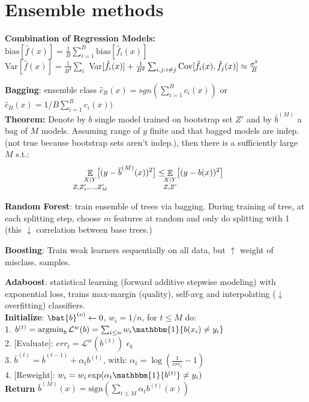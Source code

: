 \section{Ensemble methods}


\textbf{Combination of Regression Models:}\\
$\text{bias}[\hat{f}(x)] = \frac{1}{B} \sum_{i=1}^{B} \text{bias}[\hat{f}_i(x)]$\\
Var$[\hat{f}(x)] = \frac{1}{B^2}\sum_i$ Var$[\hat{f}_i(x)]
+ \frac{1}{B^2}\sum_{i,j:i\neq j} \operatorname{\textrm{Cov}}[\hat{f}_i(x), \hat{f}_j(x)] \approx \frac{\sigma^2}{B}$

\textbf{Bagging}:
ensemble class $\hat{c}_B(x)=sgn(\sum_{i=1}^{B} c_i(x))$ or $\hat{c}_B(x)=1/B\sum_{i=1}^{B} c_i(x))$\\

\textbf{Theorem:} Denote by $b$ single model trained on bootstrap set $Z'$ and by $\bar{b}^{(M)}$ a bag of $M$ models. Assuming range of $y$ finite and that bagged models are indep. (not true because bootstrap sets aren't indep.), then there is a sufficiently large $M$ s.t.:
$$
\mathop{\mathbb{E}}_{\mathclap{\substack{X|Y \\ Z, Z'_1, \ldots, Z'_M}}}\;
\big[ (y - \bar{b}^{(M)}(x))^2 \big]
\leq
\mathop{\mathbb{E}}_{\mathclap{\substack{X|Y \\ Z,Z'}}}\;
\big[ (y - b(x))^2 \big]
$$

\textbf{Random Forest}: train ensemble of trees via bagging. During training of tree, at each splitting step, choose $m$ features at random and only do splitting with 1 (this $\downarrow$ correlation between base trees.)

\textbf{Boosting}: Train weak learners sequentially on all data, but $\uparrow$ weight of misclass. samples.

\textbf{Adaboost}: statistical learning (forward additive stepwise modeling) with exponential loss, trains max-margin (quality), self-avg and interpolating ($\downarrow$ overfitting) classifiers.\\
\textbf{Initialize}: $\bat{b}^{(o)}\leftarrow 0$, $w_i = 1/n$, for $t\leq M$ do:\\
1. $b^{(t)}=\argmin_b \mathcal{L}^w(b)=\sum_{i\leq n}w_i\mathbbm{1}\{b(x_i)\neq y_i\}$\\
2. [Evaluate]: $err_t = \mathcal{L}^w(b^{(t)})$ $\epsilon_b$\\
3. $\bar b^{(t)}=\bar b^{(t-1)}+\alpha_t b^{(t)}$, with: $\alpha_t=\log(\frac{1}{err_t}-1)$\\
4. [Reweight]: $w_i = w_i \exp(\alpha_t \mathbbm{1}\{b^{(t)}\}\not = y_i)$\\
\textbf{Return} $\bar b^{(M)}(x) = \text{sign} \left ( \sum_{t\leq M} \alpha_t b^{(t)}(x) \right )$\\



